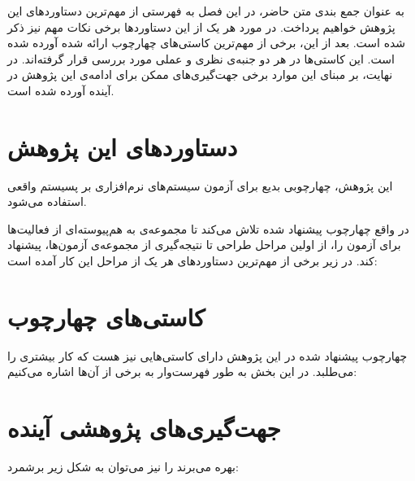 به عنوان جمع بندی متن حاضر، در این فصل به فهرستی از مهم‌ترین دستاوردهای این پژوهش خواهیم پرداخت. در مورد هر یک از این دستاوردها برخی نکات مهم نیز ذکر شده است. بعد از این، برخی از مهم‌ترین کاستی‌های چهارچوب ارائه شده آورده شده است. این کاستی‌ها در هر دو جنبه‌ی نظری و عملی مورد بررسی قرار گرفته‌اند. در نهایت، بر مبنای این موارد برخی جهت‌گیری‌های ممکن برای ادامه‌ی این پژوهش در آینده آورده شده است.

\section{دستاوردهای این پژوهش}
این پژوهش، چهارچوبی بدیع برای آزمون سیستم‌های نرم‌افزاری بر پسیستم واقعی استفاده می‌شود.

در واقع چهارچوب پیشنهاد شده تلاش می‌کند تا مجموعه‌ی به هم‌پیوسته‌ای از فعالیت‌ها برای آزمون را، از اولین مراحل طراحی تا نتیجه‌گیری از مجموعه‌ی آزمون‌ها، پیشنهاد کند. در زیر برخی از مهم‌ترین دستاورد‌های هر یک از مراحل این کار آمده است:

\section{کاستی‌های چهارچوب}
چهارچوب پیشنهاد شده در این پژوهش دارای کاستی‌هایی نیز هست که کار بیشتری را می‌طلبد. در این بخش به طور فهرست‌وار به برخی از آن‌ها اشاره می‌کنیم:
\section{جهت‌گیری‌های پژوهشی آینده}
بهره می‌برند را نیز می‌توان به شکل زیر برشمرد:

